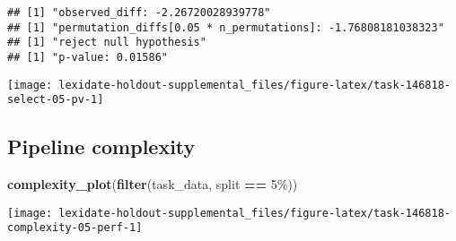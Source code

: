\documentclass[
]{book}
\newenvironment{Shaded}{\begin{snugshade}}{\end{snugshade}}
\newcommand{\AttributeTok}[1]{\textcolor[rgb]{0.13,0.29,0.53}{#1}}
\newcommand{\DecValTok}[1]{\textcolor[rgb]{0.00,0.00,0.81}{#1}}
\newcommand{\FunctionTok}[1]{\textcolor[rgb]{0.13,0.29,0.53}{\textbf{#1}}}
\newcommand{\NormalTok}[1]{#1}
\newcommand{\OtherTok}[1]{\textcolor[rgb]{0.56,0.35,0.01}{#1}}
\newcommand{\SpecialCharTok}[1]{\textcolor[rgb]{0.81,0.36,0.00}{\textbf{#1}}}
\newcommand{\StringTok}[1]{\textcolor[rgb]{0.31,0.60,0.02}{#1}}
\begin{document}
\begin{Shaded}
\end{Shaded}

\begin{verbatim}
## [1] "observed_diff: -2.26720028939778"
## [1] "permutation_diffs[0.05 * n_permutations]: -1.76808181038323"
## [1] "reject null hypothesis"
## [1] "p-value: 0.01586"
\end{verbatim}

\texttt{[image: lexidate-holdout-supplemental\_files/figure-latex/task-146818-select-05-pv-1]}

\hypertarget{pipeline-complexity}{%
\subsection{Pipeline complexity}\label{pipeline-complexity}}

\begin{Shaded}
\begin{Highlighting}[]
\FunctionTok{complexity\_plot}\NormalTok{(}\FunctionTok{filter}\NormalTok{(task\_data, split }\SpecialCharTok{==} \StringTok{\textquotesingle{}5\%\textquotesingle{}}\NormalTok{))}
\end{Highlighting}
\end{Shaded}

\texttt{[image: lexidate-holdout-supplemental\_files/figure-latex/task-146818-complexity-05-perf-1]}
\end{document}
